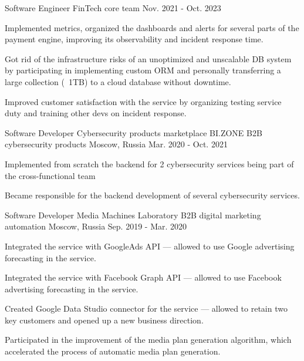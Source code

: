 \begin{cventries}
  \cventry
    {Software Engineer} %
    {FinTech core team} %
    {} %
    {} %
    {} %
    {Nov. 2021 - Oct. 2023} %
    {
      \begin{cvitems} %
        \item {Implemented metrics, organized the dashboards and alerts for several parts of the payment engine, improving its observability and incident response time.}
        \item {Got rid of the infrastructure risks of an unoptimized and unscalable DB system by participating in implementing custom ORM and personally transferring a large collection (~1TB) to a cloud database without downtime.}
        \item {Improved customer satisfaction with the service by organizing testing service duty and training other devs on incident response.}
      \end{cvitems}
    }

  \cventry
    {Software Developer} %
    {Cybersecurity products marketplace} %
    {BI.ZONE} %
    {B2B cybersecurity products} %
    {Moscow, Russia} %
    {Mar. 2020 - Oct. 2021} %
    {
      \begin{cvitems} %
        \item {Implemented from scratch the backend for 2 cybersecurity services being part of the cross-functional team}
        \item {Became responsible for the backend development of several cybersecurity services.}
      \end{cvitems}
    }

  \cventry
    {Software Developer} %
    {} %
    {Media Machines Laboratory} %
    {B2B digital marketing automation} %
    {Moscow, Russia} %
    {Sep. 2019 - Mar. 2020} %
    {
      \begin{cvitems} %
        \item {Integrated the service with GoogleAds API — allowed to use Google advertising forecasting in the service.}
        \item {Integrated the service with Facebook Graph API — allowed to use Facebook advertising forecasting in the service.}
        \item {Created Google Data Studio connector for the service — allowed to retain two key customers and opened up a new business direction.}
        \item {Participated in the improvement of the media plan generation algorithm, which accelerated the process of automatic media plan generation.}
      \end{cvitems}
    }


\end{cventries}
